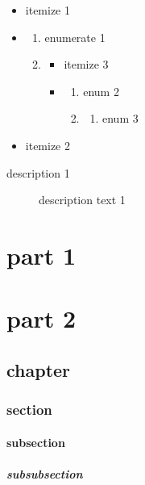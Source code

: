 \documentclass{article}
\begin{document}
\begin{itemize}
    \item[!] itemize 1
    \item \begin{enumerate}
              \item enumerate 1
              \item \begin{itemize}
                        \item itemize 3
                        \item \begin{enumerate}
                                  \item enum 2
                                  \item \begin{enumerate}
                                            \item enum 3
                                  \end{enumerate}
                        \end{enumerate}
              \end{itemize}
    \end{enumerate}
    \item itemize 2
\end{itemize}
\begin{description}
    \item[description 1] description text 1
\end{description}


\part{part 1}
\part{part 2}
\chapter{chapter}
\section{section}
\subsection{subsection}
\subsubsection{subsubsection}
\end{document}
